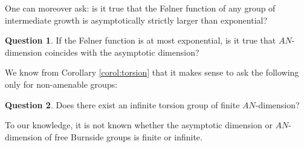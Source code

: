 \documentclass{amsart}
\numberwithin{figure}{section}
\theoremstyle{plain}
\theoremstyle{definition}
\newtheorem{question}{Question}
\begin{document}
One can moreover ask: is it true that the F{\o}lner function of any group of 
intermediate growth is asymptotically strictly larger than exponential?

\begin{question}
	If the F{\o}lner function is at most exponential, is it true that $AN$-dimension coincides with the asymptotic dimension?
\end{question}

We know from Corollary \ref{corol:torsion} that it makes sense to ask the following 
only for non-amenable groups:
\begin{question}\label{question:burnside}
Does there exist an infinite
torsion group of finite $AN$-dimension?
\end{question}
To our knowledge, it is not known whether the asymptotic dimension or  $AN$-dimension of free Burnside groups is finite or infinite.
\end{document}
